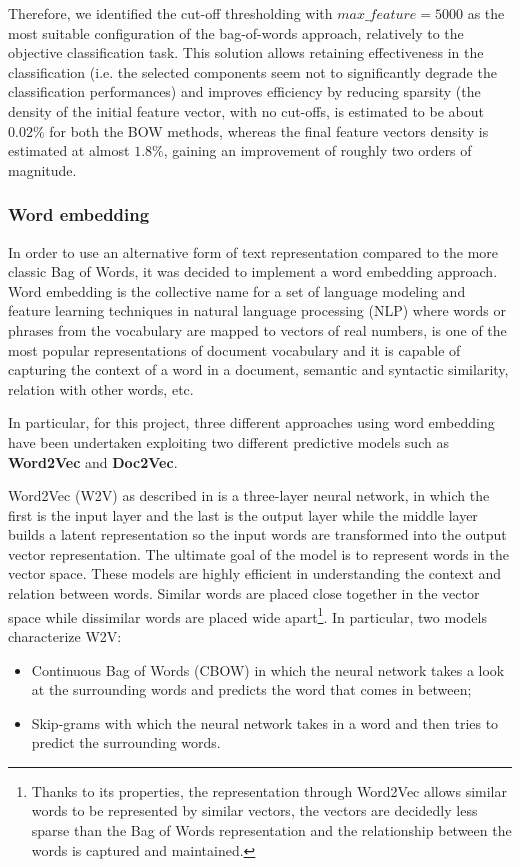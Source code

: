 \documentclass[10pt]{article}
\begin{document}
Therefore, we identified the cut-off thresholding with $max\_feature = 5000$ as the most suitable configuration of the bag-of-words approach, relatively to the objective classification task.
This solution allows retaining effectiveness in the classification (i.e. the selected components seem not to significantly degrade the classification performances) and improves efficiency by reducing sparsity (the density of the initial feature vector, with no cut-offs, is estimated to be about $0.02 \%$ for both the BOW methods, whereas the final feature vectors density is estimated at almost $1.8 \%$, gaining an improvement of roughly two orders of magnitude.

\subsubsection{Word embedding \label{subsubsec:wordembedding}}
In order to use an alternative form of text representation compared to the more classic Bag of Words, it was decided to implement a word embedding approach.
Word embedding is the collective name for a set of language modeling and feature learning techniques in natural language processing (NLP) where words or phrases from the vocabulary are mapped to vectors of real numbers, is one of the most popular representations of document vocabulary and it is capable of capturing the context of a word in a document, semantic and syntactic similarity, relation with other words, etc.

In particular, for this project, three different approaches using word embedding have been undertaken exploiting two different predictive models such as \textbf{Word2Vec} and \textbf{Doc2Vec}.

Word2Vec (W2V) as described in \cite{word2vec} is a three-layer neural network, in which the first is the input layer and the last is the output layer while the middle layer builds a latent representation so the input words are transformed into the output vector representation. 
The ultimate goal of the model is to represent words in the vector space.
These models are highly efficient in understanding the context and relation between words. 
Similar words are placed close together in the vector space while dissimilar words are placed wide apart\footnote{Thanks to its properties, the representation through Word2Vec allows similar words to be represented by similar vectors, the vectors are decidedly less sparse than the Bag of Words representation and the relationship between the words is captured and maintained.}.
In particular, two models characterize W2V:
\begin{itemize}
\item Continuous Bag of Words (CBOW) in which the neural network takes a look at the surrounding words and predicts the word that comes in between;
\item Skip-grams with which the neural network takes in a word and then tries to predict the surrounding words.
\end{itemize}
\end{document}
